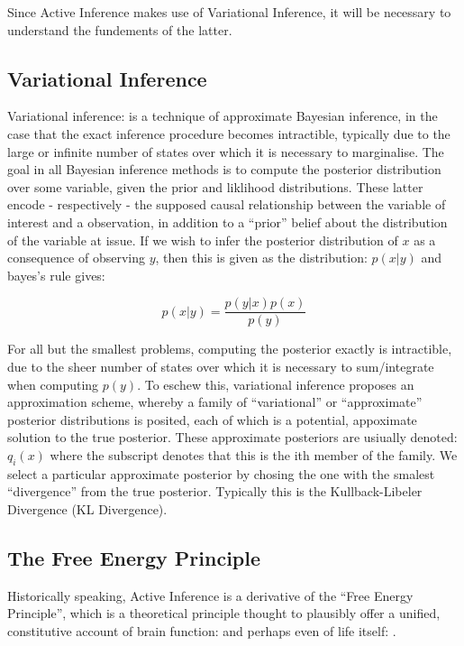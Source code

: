 \documentclass[onecolumn]{IEEEtran}
\begin{document}
Since Active Inference makes use of Variational Inference, it will be necessary to understand the fundements of the latter. 

\subsection{Variational Inference}
Variational inference: \textcite{Variational-Inference-Reviews} is a technique of approximate Bayesian inference, in the case that the exact inference procedure becomes intractible, typically due to the large or infinite number of states over which it is necessary to marginalise. The goal in all Bayesian inference methods is to compute the posterior distribution over some variable, given the prior and liklihood distributions. These latter encode - respectively - the supposed causal relationship between the variable of interest and a observation, in addition to a ``prior'' belief about the distribution of the variable at issue. If we wish to infer the posterior distribution of $x$ as a consequence of observing $y$, then this is given as the distribution: $p(x | y)$ and bayes's rule gives: 

$$ p(x | y) = \frac{p(y | x)p(x)}{p(y)}$$

For all but the smallest problems, computing the posterior exactly is intractible, due to the sheer number of states over which it is necessary to sum/integrate when computing $p(y)$. To eschew this, variational inference proposes an approximation scheme, whereby a family of ``variational'' or ``approximate'' posterior distributions is posited, each of which is a potential, appoximate solution to the true posterior. These approximate posteriors are usiually denoted: $q_i(x)$ where the subscript denotes that this is the ith member of the family. We select a particular approximate posterior by chosing the one with the smalest ``divergence'' from the true posterior. Typically this is the Kullback-Libeler Divergence (KL Divergence). 

\subsection{The Free Energy Principle}

Historically speaking, Active Inference is a derivative of the ``Free Energy Principle'', which is a theoretical principle thought to plausibly offer a unified, constitutive account of brain function: \textcite{FEP-Rough-Guide-Brain} and perhaps even of life itself: \textcite{Life-As-We-Know-It}. 
\end{document}
